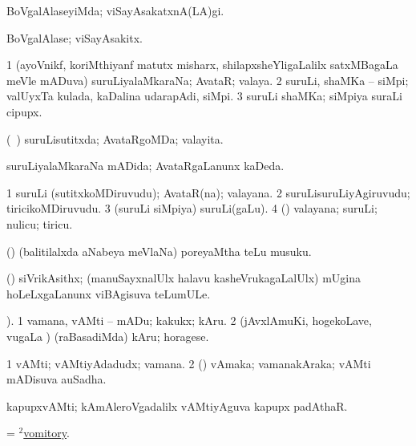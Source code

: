 \bentry 
{} 
\gl{\kirxvi}
\expl{}
\bmng
 BoVgalAlaseyiMda; viSayAsakatxnA(LA)gi. 
\emng
\eentry

\bentry 
{} 
\gl{\nA}
\expl{}
\bmng
 BoVgalAlase; viSayAsakitx. 
\emng
\eentry

\bentry
{} 
\gl{\nA}
\expl{}
\bmng
\bnum
\num{1} (ayoVnikf, koriMthiyanf matutx misharx, shilapxsheYligaLalilx satxMBagaLa meVle mADuva) suruLiyalaMkaraNa; AvataR; valaya. 
\num{2} suruLi, shaMKa -- siMpi; valUyxTa kulada, kaDalina udarapAdi, siMpi. 
\num{3} suruLi shaMKa; siMpiya suraLi cipupx. 
\enum
\emng
\eentry

\bentry
{} 
\gl{\gu}
\expl{}
\bmng
 (\kanmu\ \savi) suruLisutitxda; AvataRgoMDa; valayita. 
\emng
\eentry

\bentry 
{} 
\gl{\gu}
\expl{}
\bmng
suruLiyalaMkaraNa mADida; AvataRgaLanunx kaDeda. 
\emng
\eentry

\bentry 
{} 
\gl{\nA}
\expl{}
\bmng
\bnum
\num{1} suruLi (sutitxkoMDiruvudu); AvataR(na); valayana. 
\num{2} suruLisuruLiyAgiruvudu; tiricikoMDiruvudu. 
\num{3} (suruLi siMpiya) suruLi(gaLu). 
\num{4} (\aMrashA) valayana; suruLi; nulicu; tiricu. 
\enum
\emng
\eentry

\bentry 
{} 
\gl{\nA}
\expl{}
\bmng
 (\savi) (balitilalxda aNabeya meVlaNa) poreyaMtha teLu musuku. 
\emng
\eentry

\bentry 
{} 
\gl{\nA}
\expl{}
\bmng
 (\aMrashA) siVrikAsithx; (manuSayxnalUlx halavu kasheVrukagaLalUlx) mUgina hoLeLxgaLanunx viBAgisuva teLumULe. 
\emng
\eentry

\bentry
{} 
\gl{\sakirx}
). \bmng
\bnum
\num{1} vamana, vAMti -- mADu; kakukx; kAru. 
\num{2} (jAvxlAmuKi, hogekoLave, \mo vugaLa \vi) (raBasadiMda) kAru; horagese. 
\enum
\emng
\eentry

\bentry 
{} 
\gl{\nA}
\expl{}
\bmng
\bnum
\num{1} vAMti; vAMtiyAdadudx; vamana. 
\num{2} (\pArxparx) vAmaka; vamanakAraka; vAMti mADisuva auSadha. 
\enum
\emng

\noindent 
\gl{\pagu}
\expl{}
\bmng
{} kapupxvAMti; kAmAleroVgadalilx vAMtiyAguva kapupx padAthaR. 
\emng
\eentry

\bentry
{} 
\gl{\nA}
\bmng
 = \hyperlink{vomitory(2)}{$^2$vomitory}. 
\emng
\eentry

